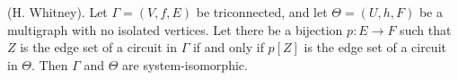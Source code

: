 (H. Whitney). Let $\Gamma = (V, f, E)$ be triconnected, and let $\Theta = (U, h, F)$ be a multigraph with no isolated vertices. Let there be a bijection $p: E \rightarrow F$ such that $Z$ is the edge set of a circuit in $\Gamma$ if and only if $p[Z]$ is the edge set of a circuit in $\Theta$. Then $\Gamma$ and $\Theta$ are system-isomorphic.
